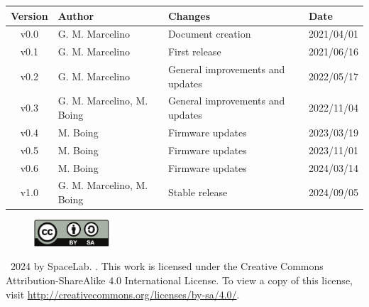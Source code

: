 \begin{table}[!ht]
    \begin{center}
        \begin{tabular}{cL{5cm}L{5.5cm}C{2cm}}
            \toprule[1.5pt]
            \textbf{Version} & \textbf{Author}  & \textbf{Changes}    & \textbf{Date} \\
            \midrule
            v0.0 & G. M. Marcelino           & Document creation   & 2021/04/01 \\
            v0.1 & G. M. Marcelino           & First release       & 2021/06/16 \\
            v0.2 & G. M. Marcelino           & General improvements and updates & 2022/05/17 \\
            v0.3 & G. M. Marcelino, M. Boing & General improvements and updates & 2022/11/04 \\
            v0.4 & M. Boing                  & Firmware updates & 2023/03/19 \\
            v0.5 & M. Boing                  & Firmware updates & 2023/11/01 \\
            v0.6 & M. Boing                  & Firmware updates & 2024/03/14 \\
            v1.0 & G. M. Marcelino, M. Boing & Stable release   & 2024/09/05 \\
            \bottomrule[1.5pt]
        \end{tabular}
    \end{center}
\end{table}

\vfill

\begin{figure}[!h]
	\begin{center}
		\includegraphics[width=0.25\textwidth]{figures/by-sa.pdf}
	\end{center}
\end{figure}

\textcopyright\  2024 by SpaceLab. \thetitle. This work is licensed under the Creative Commons Attribution-ShareAlike 4.0 International License. To view a copy of this license, visit \href{http://creativecommons.org/licenses/by-sa/4.0/}{http://creativecommons.org/licenses/by-sa/4.0/}.
